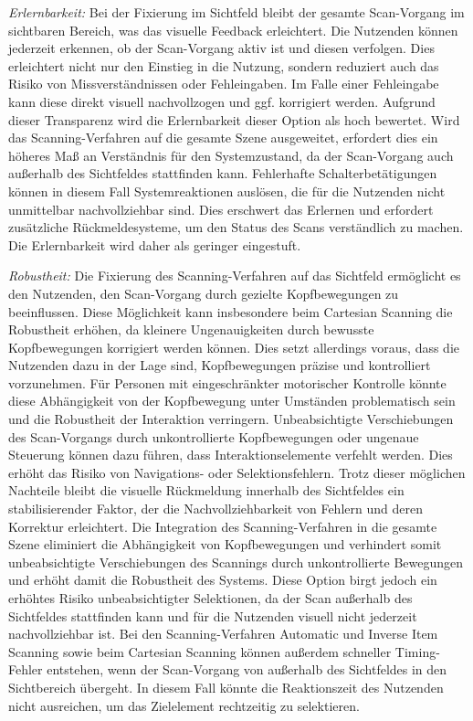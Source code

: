 \textit{Erlernbarkeit:} 
Bei der Fixierung im Sichtfeld bleibt der gesamte Scan-Vorgang im sichtbaren Bereich, was das visuelle Feedback erleichtert. Die Nutzenden können jederzeit erkennen, ob der Scan-Vorgang aktiv ist und diesen verfolgen. Dies erleichtert nicht nur den Einstieg in die Nutzung, sondern reduziert auch das Risiko von Missverständnissen oder Fehleingaben. Im Falle einer Fehleingabe kann diese direkt visuell nachvollzogen und ggf. korrigiert werden. Aufgrund dieser Transparenz wird die Erlernbarkeit dieser Option als hoch bewertet.
Wird das Scanning-Verfahren auf die gesamte Szene ausgeweitet, erfordert dies ein höheres Maß an Verständnis für den Systemzustand, da der Scan-Vorgang auch außerhalb des Sichtfeldes stattfinden kann. Fehlerhafte Schalterbetätigungen können in diesem Fall Systemreaktionen auslösen, die für die Nutzenden nicht unmittelbar nachvollziehbar sind. Dies erschwert das Erlernen und erfordert zusätzliche Rückmeldesysteme, um den Status des Scans verständlich zu machen. Die Erlernbarkeit wird daher als geringer eingestuft. 

\textit{Robustheit:}
Die Fixierung des Scanning-Verfahren auf das Sichtfeld ermöglicht es den Nutzenden, den Scan-Vorgang durch gezielte Kopfbewegungen zu beeinflussen. Diese Möglichkeit kann insbesondere beim Cartesian Scanning die Robustheit erhöhen, da kleinere Ungenauigkeiten durch bewusste Kopfbewegungen korrigiert werden können. Dies setzt allerdings voraus, dass die Nutzenden dazu in der Lage sind, Kopfbewegungen präzise und kontrolliert vorzunehmen. Für Personen mit eingeschränkter motorischer Kontrolle könnte diese Abhängigkeit von der Kopfbewegung unter Umständen problematisch sein und die Robustheit der Interaktion verringern. Unbeabsichtigte Verschiebungen des Scan-Vorgangs durch unkontrollierte Kopfbewegungen oder ungenaue Steuerung können dazu führen, dass Interaktionselemente verfehlt werden. Dies erhöht das Risiko von Navigations- oder Selektionsfehlern. Trotz dieser möglichen Nachteile bleibt die visuelle Rückmeldung innerhalb des Sichtfeldes ein stabilisierender Faktor, der die Nachvollziehbarkeit von Fehlern und deren Korrektur erleichtert. 
Die Integration des Scanning-Verfahren in die gesamte Szene eliminiert die Abhängigkeit von Kopfbewegungen und verhindert somit unbeabsichtigte Verschiebungen des Scannings durch unkontrollierte Bewegungen und erhöht damit die Robustheit des Systems. Diese Option birgt jedoch ein erhöhtes Risiko unbeabsichtigter Selektionen, da der Scan außerhalb des Sichtfeldes stattfinden kann und für die Nutzenden visuell nicht jederzeit nachvollziehbar ist. Bei den Scanning-Verfahren Automatic und Inverse Item Scanning sowie beim Cartesian Scanning können außerdem schneller Timing-Fehler entstehen, wenn der Scan-Vorgang von außerhalb des Sichtfeldes in den Sichtbereich übergeht. In diesem Fall könnte die Reaktionszeit des Nutzenden nicht ausreichen, um das Zielelement rechtzeitig zu selektieren. 

